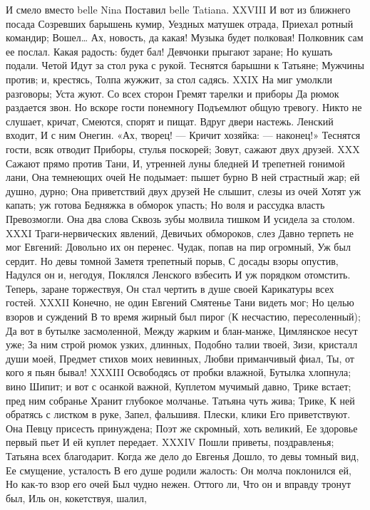 И смело вместо belle Nina
Поставил belle Tatiana.
XXVIII
И вот из ближнего посада
Созревших барышень кумир,
Уездных матушек отрада,
Приехал ротный командир;
Вошел… Ах, новость, да какая!
Музыка будет полковая!
Полковник сам ее послал.
Какая радость: будет бал!
Девчонки прыгают заране;
Но кушать подали. Четой
Идут за стол рука с рукой.
Теснятся барышни к Татьяне;
Мужчины против; и, крестясь,
Толпа жужжит, за стол садясь.
XXIX
На миг умолкли разговоры;
Уста жуют. Со всех сторон
Гремят тарелки и приборы
Да рюмок раздается звон.
Но вскоре гости понемногу
Подъемлют общую тревогу.
Никто не слушает, кричат,
Смеются, спорят и пищат.
Вдруг двери настежь. Ленский входит,
И с ним Онегин. «Ах, творец! —
Кричит хозяйка: — наконец!»
Теснятся гости, всяк отводит
Приборы, стулья поскорей;
Зовут, сажают двух друзей.
XXX
Сажают прямо против Тани,
И, утренней луны бледней
И трепетней гонимой лани,
Она темнеющих очей
Не подымает: пышет бурно
В ней страстный жар; ей душно, дурно;
Она приветствий двух друзей
Не слышит, слезы из очей
Хотят уж капать; уж готова
Бедняжка в обморок упасть;
Но воля и рассудка власть
Превозмогли. Она два слова
Сквозь зубы молвила тишком
И усидела за столом.
XXXI
Траги-нервических явлений,
Девичьих обмороков, слез
Давно терпеть не мог Евгений:
Довольно их он перенес.
Чудак, попав на пир огромный,
Уж был сердит. Но девы томной
Заметя трепетный порыв,
С досады взоры опустив,
Надулся он и, негодуя,
Поклялся Ленского взбесить
И уж порядком отомстить.
Теперь, заране торжествуя,
Он стал чертить в душе своей
Карикатуры всех гостей.
XXXII
Конечно, не один Евгений
Смятенье Тани видеть мог;
Но целью взоров и суждений
В то время жирный был пирог
(К несчастию, пересоленный);
Да вот в бутылке засмоленной,
Между жарким и блан-манже,
Цимлянское несут уже;
За ним строй рюмок узких, длинных,
Подобно талии твоей,
Зизи, кристалл души моей,
Предмет стихов моих невинных,
Любви приманчивый фиал,
Ты, от кого я пьян бывал!
XXXIII
Освободясь от пробки влажной,
Бутылка хлопнула; вино
Шипит; и вот с осанкой важной,
Куплетом мучимый давно,
Трике встает; пред ним собранье
Хранит глубокое молчанье.
Татьяна чуть жива; Трике,
К ней обратясь с листком в руке,
Запел, фальшивя. Плески, клики
Его приветствуют. Она
Певцу присесть принуждена;
Поэт же скромный, хоть великий,
Ее здоровье первый пьет
И ей куплет передает.
XXXIV
Пошли приветы, поздравленья;
Татьяна всех благодарит.
Когда же дело до Евгенья
Дошло, то девы томный вид,
Ее смущение, усталость
В его душе родили жалость:
Он молча поклонился ей,
Но как-то взор его очей
Был чудно нежен. Оттого ли,
Что он и вправду тронут был,
Иль он, кокетствуя, шалил,
